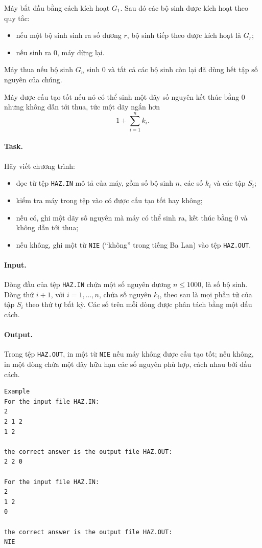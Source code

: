 \documentclass[11pt]{article}
\begin{document}
Máy bắt đầu bằng cách kích hoạt \(G_1\). Sau đó các bộ sinh được kích hoạt theo
quy tắc:
\begin{itemize}
  \item nếu một bộ sinh sinh ra số dương \(r\), bộ sinh tiếp theo được kích hoạt
  là \(G_r\);
  \item nếu sinh ra 0, máy dừng lại.
\end{itemize}

Máy thua nếu bộ sinh \(G_n\) sinh 0 và tất cả các bộ sinh còn lại đã dùng hết
tập số nguyên của chúng.

Máy được cấu tạo tốt nếu nó có thể sinh một dãy số nguyên kết thúc bằng 0 nhưng
không dẫn tới thua, tức một dãy ngắn hơn
\[
  1+\sum_{i=1}^{n} k_i.
\]

\paragraph{Task.}
Hãy viết chương trình:
\begin{itemize}
  \item đọc từ tệp \texttt{HAZ.IN} mô tả của máy, gồm số bộ sinh \(n\), các số
  \(k_i\) và các tập \(S_i\);
  \item kiểm tra máy trong tệp vào có được cấu tạo tốt hay không;
  \item nếu có, ghi một dãy số nguyên mà máy có thể sinh ra, kết thúc bằng 0 và
  không dẫn tới thua;
  \item nếu không, ghi một từ \texttt{NIE} (``không'' trong tiếng Ba Lan) vào
  tệp \texttt{HAZ.OUT}.
\end{itemize}

\paragraph{Input.}
Dòng đầu của tệp \texttt{HAZ.IN} chứa một số nguyên dương \(n\le 1000\), là số
bộ sinh. Dòng thứ \(i+1\), với \(i=1,\ldots,n\), chứa số nguyên \(k_i\), theo
sau là mọi phần tử của tập \(S_i\) theo thứ tự bất kỳ. Các số trên mỗi dòng được
phân tách bằng một dấu cách.

\paragraph{Output.}
Trong tệp \texttt{HAZ.OUT}, in một từ \texttt{NIE} nếu máy không được cấu tạo
tốt; nếu không, in một dòng chứa một dãy hữu hạn các số nguyên phù hợp, cách
nhau bởi dấu cách.

\begin{verbatim}
Example
For the input file HAZ.IN:
2
2 1 2
1 2

the correct answer is the output file HAZ.OUT:
2 2 0

For the input file HAZ.IN:
2
1 2
0

the correct answer is the output file HAZ.OUT:
NIE
\end{verbatim}
\end{document}
